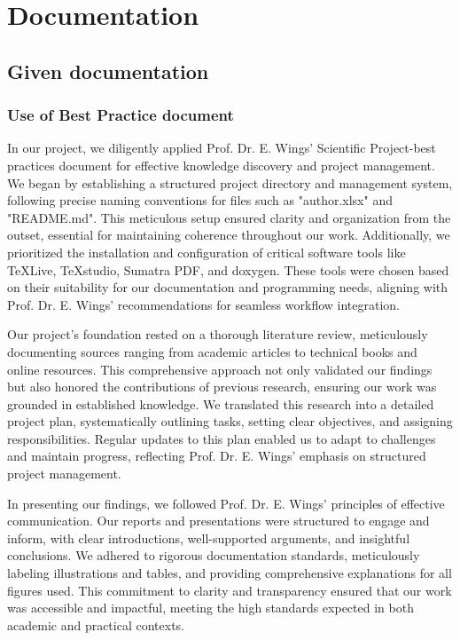 %
%
%

\chapter{Documentation}

\section{Given documentation}

\subsection{Use of Best Practice document}

In our project, we diligently applied Prof. Dr. E. Wings' Scientific Project-best practices document for effective knowledge discovery and project management. We began by establishing a structured project directory and management system, following precise naming conventions for files such as "author.xlsx" and "README.md". This meticulous setup ensured clarity and organization from the outset, essential for maintaining coherence throughout our work. Additionally, we prioritized the installation and configuration of critical software tools like TeXLive, TeXstudio, Sumatra PDF, and doxygen. These tools were chosen based on their suitability for our documentation and programming needs, aligning with Prof. Dr. E. Wings' recommendations for seamless workflow integration.

Our project's foundation rested on a thorough literature review, meticulously documenting sources ranging from academic articles to technical books and online resources. This comprehensive approach not only validated our findings but also honored the contributions of previous research, ensuring our work was grounded in established knowledge. We translated this research into a detailed project plan, systematically outlining tasks, setting clear objectives, and assigning responsibilities. Regular updates to this plan enabled us to adapt to challenges and maintain progress, reflecting Prof. Dr. E. Wings' emphasis on structured project management.

In presenting our findings, we followed Prof. Dr. E. Wings' principles of effective communication. Our reports and presentations were structured to engage and inform, with clear introductions, well-supported arguments, and insightful conclusions. We adhered to rigorous documentation standards, meticulously labeling illustrations and tables, and providing comprehensive explanations for all figures used. This commitment to clarity and transparency ensured that our work was accessible and impactful, meeting the high standards expected in both academic and practical contexts.


